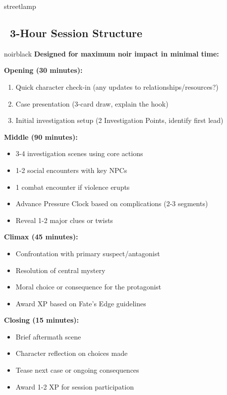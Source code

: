 \documentclass[11pt]{article}
\begin{document}
\begin{noirsection}{streetlamp}
\subsection*{\faClock\ 3-Hour Session Structure}

\begin{mechanicbox}{noirblack}
\textbf{Designed for maximum noir impact in minimal time:}

\textbf{Opening (30 minutes):}
\begin{enumerate}
    \item Quick character check-in (any updates to relationships/resources?)
    \item Case presentation (3-card draw, explain the hook)
    \item Initial investigation setup (2 Investigation Points, identify first lead)
\end{enumerate}

\textbf{Middle (90 minutes):}
\begin{itemize}
    \item 3-4 investigation scenes using core actions
    \item 1-2 social encounters with key NPCs
    \item 1 combat encounter if violence erupts
    \item Advance Pressure Clock based on complications (2-3 segments)
    \item Reveal 1-2 major clues or twists
\end{itemize}

\textbf{Climax (45 minutes):}
\begin{itemize}
    \item Confrontation with primary suspect/antagonist
    \item Resolution of central mystery
    \item Moral choice or consequence for the protagonist
    \item Award XP based on Fate's Edge guidelines
\end{itemize}

\textbf{Closing (15 minutes):}
\begin{itemize}
    \item Brief aftermath scene
    \item Character reflection on choices made
    \item Tease next case or ongoing consequences
    \item Award 1-2 XP for session participation
\end{itemize}
\end{mechanicbox}


\end{noirsection}
\end{document}
